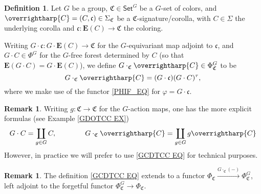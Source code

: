\documentclass[a4paper,10pt
 ,final
]{article}%
\numberwithin{equation}{section}
\numberwithin{figure}{section}
\theoremstyle{definition} %
\newtheorem{definition}[equation]{Definition}%
\newtheorem{remark}[equation]{Remark}%
\newcommand{\vect}[1]{\text{\overrightharp{\ensuremath{#1}}}}
\newcommand{\1}{\ensuremath{\mathbbm 1}}%
\begin{document}
\begin{definition}
        \label{GCC_DEF}
Let $G$ be a group,
$\mathfrak{C} \in \mathsf{Set}^G$
be a $G$-set of colors, 
and $\vect{C}  = (C, \mathfrak c) \in \Sigma_{\mathfrak{C}}$ be a $\mathfrak{C}$-signature/corolla,
with
$C\in \Sigma$ the underlying corolla
and 
$\mathfrak{c} \colon \boldsymbol{E}(C) \to \mathfrak{C}$ the coloring.

Writing 
$G \cdot \mathfrak{c} \colon G \cdot \boldsymbol{E}(C) \to \mathfrak{C}$
for the $G$-equivariant map adjoint to $\mathfrak c$, 
and $G \cdot C  \in \Phi^G$
for the $G$-free forest determined by $C$ 
(so that $\boldsymbol{E}(G \cdot C) = 
G \cdot \boldsymbol{E}(C)$),
we define $G \cdot_{\mathfrak{C}} \vect{C} \in \Phi^G_{\mathfrak{C}}$ to be
\begin{equation}\label{GCDTCC EQ}
G \cdot_{\mathfrak{C}} \vect{C} = 
(G \cdot \mathfrak{c})(G \cdot C)^{\tau},
\end{equation}
where we make use of the functor \eqref{PHIF_EQ}
for $\varphi = G \cdot \mathfrak{c}$.
\end{definition}



\begin{remark}
Writing $g \colon \mathfrak{C} \to \mathfrak{C}$
for the $G$-action maps,
one has the more explicit formulas 
(see Example \ref{GDOTCC EX})
\[
        G \cdot C = \coprod_{g \in G} C,
        \qquad
        \qquad
G \cdot_{\mathfrak{C}} \vect{C}
= 
\coprod_{g \in G}
g \vect{C}
\]
However, in practice we will prefer to use 
\eqref{GCDTCC EQ} for technical purposes.
\end{remark}


\begin{remark}
The definition \eqref{GCDTCC EQ}
extends to a functor
$\Phi_{\mathfrak{C}}
\xrightarrow{G \cdot_{\mathfrak{C}} (-)}
\Phi_{\mathfrak{C}}^G$,
left adjoint to the forgetful functor
$ \Phi_{\mathfrak{C}}^G
\to \Phi_{\mathfrak{C}}$.
\end{remark}
\end{document}
